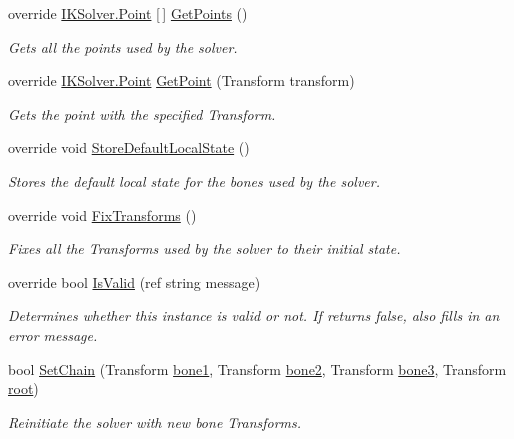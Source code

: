 \begin{DoxyCompactItemize}
override \mbox{\hyperlink{class_root_motion_1_1_final_i_k_1_1_i_k_solver_1_1_point}{I\+K\+Solver.\+Point}} \mbox{[}$\,$\mbox{]} \mbox{\hyperlink{class_root_motion_1_1_final_i_k_1_1_i_k_solver_trigonometric_a4cdd035f3007bc29385299e6d3c3cea9}{Get\+Points}} ()
\begin{DoxyCompactList}\small\item\em Gets all the points used by the solver. \end{DoxyCompactList}\item 
override \mbox{\hyperlink{class_root_motion_1_1_final_i_k_1_1_i_k_solver_1_1_point}{I\+K\+Solver.\+Point}} \mbox{\hyperlink{class_root_motion_1_1_final_i_k_1_1_i_k_solver_trigonometric_a4467e4a83b21ffeb535801b09798bf06}{Get\+Point}} (Transform transform)
\begin{DoxyCompactList}\small\item\em Gets the point with the specified Transform. \end{DoxyCompactList}\item 
override void \mbox{\hyperlink{class_root_motion_1_1_final_i_k_1_1_i_k_solver_trigonometric_a3bd5cac71942dfc1104cad6326469acb}{Store\+Default\+Local\+State}} ()
\begin{DoxyCompactList}\small\item\em Stores the default local state for the bones used by the solver. \end{DoxyCompactList}\item 
override void \mbox{\hyperlink{class_root_motion_1_1_final_i_k_1_1_i_k_solver_trigonometric_a46aa3acfba8c4c23dc23f00f29249d90}{Fix\+Transforms}} ()
\begin{DoxyCompactList}\small\item\em Fixes all the Transforms used by the solver to their initial state. \end{DoxyCompactList}\item 
override bool \mbox{\hyperlink{class_root_motion_1_1_final_i_k_1_1_i_k_solver_trigonometric_a96e4567149a2309a7d1554ec6c8b3e16}{Is\+Valid}} (ref string message)
\begin{DoxyCompactList}\small\item\em Determines whether this instance is valid or not. If returns false, also fills in an error message. \end{DoxyCompactList}\item 
bool \mbox{\hyperlink{class_root_motion_1_1_final_i_k_1_1_i_k_solver_trigonometric_a4a5e5e9b02e9a47ab2caa0b14c656b0c}{Set\+Chain}} (Transform \mbox{\hyperlink{class_root_motion_1_1_final_i_k_1_1_i_k_solver_trigonometric_a3c29124b8fc59d81406c2ce57da202eb}{bone1}}, Transform \mbox{\hyperlink{class_root_motion_1_1_final_i_k_1_1_i_k_solver_trigonometric_a27296f269cce9e3806879ffc67778525}{bone2}}, Transform \mbox{\hyperlink{class_root_motion_1_1_final_i_k_1_1_i_k_solver_trigonometric_ac8cfb2c6ba0009f99bfde09b6b174a3a}{bone3}}, Transform \mbox{\hyperlink{class_root_motion_1_1_final_i_k_1_1_i_k_solver_add558b38f163259934c37a0f1b497c06}{root}})
\begin{DoxyCompactList}\small\item\em Reinitiate the solver with new bone Transforms. \end{DoxyCompactList}\end{DoxyCompactItemize}
